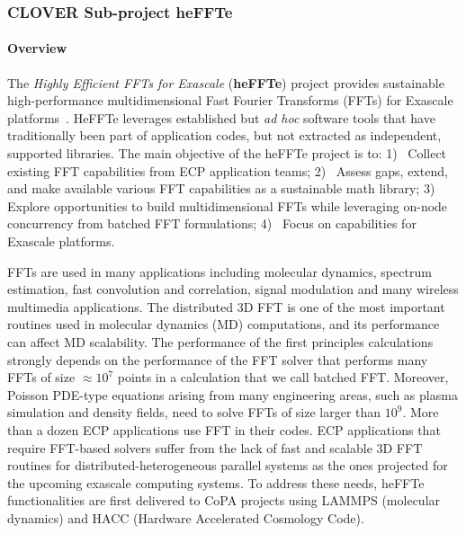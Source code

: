 \subsubsection{ CLOVER Sub-project heFFTe}\label{subsubsect:fftecp}


\paragraph{Overview}

The {\it Highly Efficient FFTs for Exascale} ({\bf heFFTe}) project provides sustainable 
high-performance multidimensional Fast Fourier Transforms (FFTs) for Exascale 
platforms~\cite{thasd19,heffte-iccs20}.
HeFFTe leverages established but {\it ad hoc} 
software tools that have traditionally been part of application 
codes, but not extracted as independent, supported libraries. 
%
The main objective of the heFFTe project is to:
1)~ 
      Collect existing FFT capabilities from ECP 
      application teams;
2)~
      Assess gaps, extend, and make available various FFT
      capabilities as a sustainable math library;
3)~      
      Explore opportunities to build multidimensional FFTs
      while leveraging on-node concurrency from 
      batched FFT formulations;
4)~
      Focus on capabilities for Exascale platforms.

FFTs are used in many applications including molecular dynamics, 
spectrum estimation, fast convolution and correlation, signal 
modulation and many wireless multimedia applications. The 
distributed 3D FFT is one of the most important routines used 
in molecular dynamics (MD) computations, and its performance can 
affect MD scalability. The performance of the first 
principles calculations strongly depends on the performance of the 
FFT solver that performs many FFTs of size $\approx 10^7$ points in 
a calculation that we call batched FFT. Moreover, Poisson PDE-type 
equations arising from many engineering areas, such as plasma
simulation and density fields, need to solve FFTs of size larger than $10^9$. 
%
More than a dozen ECP applications use FFT in their codes.
ECP applications that require FFT-based solvers suffer from the lack of 
fast and scalable 3D FFT routines for distributed-heterogeneous parallel 
systems as the ones projected for the upcoming exascale computing systems. 
To address these needs, heFFTe functionalities are first delivered 
to CoPA projects using LAMMPS (molecular dynamics) and HACC (Hardware Accelerated
Cosmology Code).

